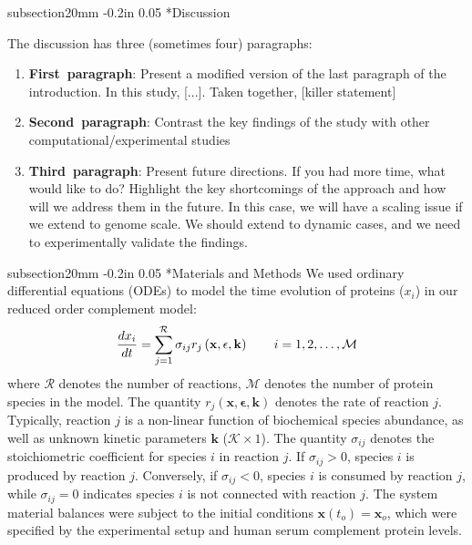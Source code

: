 \documentclass[12pt]{article}
\makeatletter
\renewcommand\section{\@startsection
	{subsection}{2}{0mm}
	{-0.2in}
	{0.05\baselineskip}
	{\normalfont\large\bfseries}}
\makeatother
\begin{document}
\clearpage

%

\section*{Discussion}

The discussion has three (sometimes four) paragraphs:
\begin{enumerate}
	\item{\textbf{First~paragraph}: Present a modified version of the last paragraph of the introduction. In this study, [...]. Taken together, [killer statement]}
	\item{\textbf{Second~paragraph}: Contrast the key findings of the study with other computational/experimental studies}
	\item{\textbf{Third~paragraph}: Present future directions. If you had more time, what would like to do? Highlight the key shortcomings of the approach and how will we address them in the future.
	In this case, we will have a scaling issue if we extend to genome scale. We should extend to dynamic cases, and we need to experimentally validate the findings. }
\end{enumerate}

\clearpage

\section*{Materials and Methods}
We used ordinary differential equations (ODEs) to model the time evolution of proteins ($x_{i}$) in our reduced order complement model:
\begin{equation}
	\frac{dx_{i}}{dt}  =  \sum_{j = 1}^{\mathcal{R}}\sigma_{ij}r_{j}\left(\mathbf{x},\mathbf{\epsilon},\mathbf{k}\right)\qquad{i=1,2,\hdots,\mathcal{M}}\\
\end{equation}
where $\mathcal{R}$ denotes the number of reactions, $\mathcal{M}$ denotes the number of protein species in the model.
The quantity $r_{j}\left(\mathbf{x},\mathbf{\epsilon},\mathbf{k}\right)$ denotes the rate of reaction $j$.
Typically, reaction $j$ is a non-linear function of biochemical species abundance, as well as unknown kinetic parameters $\mathbf{k}$ ($\mathcal{K}\times{1}$).
The quantity $\sigma_{ij}$ denotes the stoichiometric coefficient for species $i$ in reaction $j$.
If $\sigma_{ij}>0$, species $i$ is produced by reaction $j$.
Conversely, if $\sigma_{ij}<0$, species $i$ is consumed by reaction $j$, while $\sigma_{ij} = 0$ indicates species $i$ is not connected with reaction $j$.
The system material balances were subject to the initial conditions $\mathbf{x}\left(t_{o}\right) = \mathbf{x}_{o}$, which were specified by the experimental setup and human serum complement protein levels.
\end{document}
